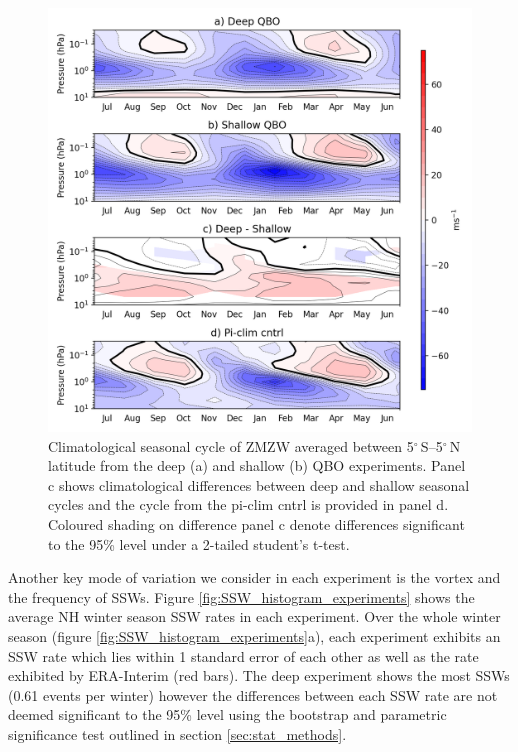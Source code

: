 \begin{figure}[h!]
\begin{center}
\noindent\includegraphics[width = 0.75\linewidth]{Figures/Figures-deepQBO/SAO_seasonal_cycles.png}
\caption[Climatological seasonal cycle of the SAO in QBO experiments]{Climatological seasonal cycle of ZMZW averaged between 5$^{\circ}$\,S--5$^{\circ}$\,N latitude from the deep (a) and shallow (b) QBO experiments. Panel c shows climatological differences between deep and shallow seasonal cycles and the cycle from the pi-clim cntrl is provided in panel d. Coloured shading on difference panel c denote differences significant to the 95\% level under a 2-tailed student's t-test.}
\label{fig:experiment_SAOs}
\end{center}
\end{figure}

Another key mode of variation we consider in each experiment is the vortex and the frequency of SSWs. Figure \ref{fig:SSW_histogram_experiments} shows the average NH winter season SSW rates in each experiment. Over the whole winter season (figure \ref{fig:SSW_histogram_experiments}a), each experiment exhibits an SSW rate which lies within 1 standard error of each other as well as the rate exhibited by ERA-Interim (red bars). The deep experiment shows the most SSWs (0.61 events per winter) however the differences between each SSW rate are not deemed significant to the 95\% level using the bootstrap and parametric significance test outlined in section \ref{sec:stat_methods}. 

